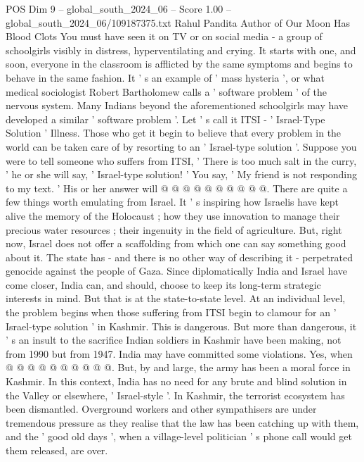 \begin{textsample}{POS Dim 9 – global\_south\_2024\_06 – Score 1.00 – global\_south\_2024\_06/109187375.txt}  \label{ex:f9_pos_058}
Rahul Pandita Author of Our Moon Has Blood Clots You must have seen it on TV or on social media - a group of schoolgirls visibly in distress, hyperventilating and crying.
It starts with one, and soon, everyone in the classroom is afflicted by the same symptoms and begins to behave in the same fashion.
It ' s an example of ' mass hysteria ', or what medical sociologist Robert Bartholomew calls a ' software problem ' of the nervous system.
Many Indians beyond the aforementioned schoolgirls may have developed a similar ' software problem '.
Let ' s call it ITSI - ' Israel-Type Solution ' Illness.
Those who get it begin to believe that every problem in the world can be taken care of by resorting to an ' Israel-type solution '.
Suppose you were to tell someone who suffers from ITSI, ' There is too much salt in the curry, ' he or she will say, ' Israel-type solution! ' You say, ' My friend is not responding to my text. ' His or her answer will @ @ @ @ @ @ @ @ @ @.
There are quite a few things worth emulating from Israel.
It ' s inspiring how Israelis have kept alive the memory of the Holocaust ; how they use innovation to manage their precious water resources ; their ingenuity in the field of agriculture.
But, right now, Israel does not offer a scaffolding from which one can say something good about it.
The state has - and there is no other way of describing it - perpetrated genocide against the people of Gaza.
Since diplomatically India and Israel have come closer, India can, and should, choose to keep its long-term strategic interests in mind.
But that is at the state-to-state level.
At an individual level, the problem begins when those suffering from ITSI begin to clamour for an ' Israel-type solution ' in Kashmir.
This is dangerous.
But more than dangerous, it ' s an insult to the sacrifice Indian soldiers in Kashmir have been making, not from 1990 but from 1947.
India may have committed some violations.
Yes, when @ @ @ @ @ @ @ @ @ @.
But, by and large, the army has been a moral force in Kashmir.
In this context, India has no need for any brute and blind solution in the Valley or elsewhere, ' Israel-style '.
In Kashmir, the terrorist ecosystem has been dismantled.
Overground workers and other sympathisers are under tremendous pressure as they realise that the law has been catching up with them, and the ' good old days ', when a village-level politician ' s phone call would get them released, are over.

\end{textsample}
